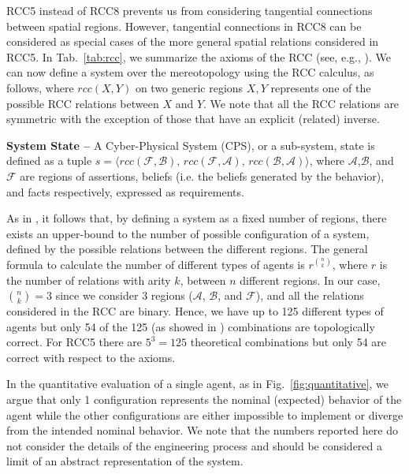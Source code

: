 \documentclass[runningheads]{llncs}
\newcommand{\assertionRegion}{\mathcal{A}}
\newcommand{\beliefRegion}{\mathcal{B}}
\newcommand{\factRegion}{\mathcal{F}}
\newcommand{\rcc}{rcc}
\begin{document}
RCC5 instead of RCC8 prevents us from considering tangential connections
between spatial regions. However, tangential connections in RCC8 can be
considered as special cases of the more general spatial relations considered in
RCC5.
In Tab.~\ref{tab:rcc}, we summarize the axioms of the RCC (see, e.g., \autocite{Grutter2008rcc}).  We can now define a system
over the mereotopology using the RCC calculus, as follows, where $\rcc(X,Y)$ on
two generic regions $X,Y$ represents one of the possible RCC relations between
$X$ and $Y$. We note that all the RCC relations are symmetric with the exception
of those that have an explicit (related) inverse.

\begin{definition}{\bf System State --}\label{def:opsystem}
  A Cyber-Physical System (CPS), or a sub-system, state is defined as a tuple
	$s=\langle\rcc(\factRegion,\beliefRegion),\,\rcc(\factRegion,\assertionRegion),\,\rcc(\beliefRegion,\assertionRegion)\rangle$,
	where $\assertionRegion$,$\beliefRegion$, and $\factRegion$ are regions of
	assertions, beliefs (i.e. the beliefs generated by the behavior), and
	facts respectively, expressed as requirements.
\end{definition}

As in \autocite{Santaca2016abf}, it follows that, by defining
a system as a fixed number of regions, there exists
an upper-bound to the number of possible configuration of a system, defined by
the possible relations between the different regions.
The general formula to calculate the number of different types of agents is
$r^{\binom{n}{k}}$, where $r$ is the number of relations with arity $k$,
between $n$ different regions. In our case, $\binom{n}{k}=3$ since we consider $3$ regions 
($\assertionRegion$, $\beliefRegion$, and $\factRegion$), and all the relations
considered in the RCC are binary.  Hence, we have up to 125
different types of agents but only 54 of the 125 (as showed in
\autocite{Grutter2008rcc}) combinations are topologically correct. 
For RCC5 there are $5^3=125$ theoretical combinations but
only 54 are correct with respect to the axioms.

In the quantitative evaluation of a single agent, as in Fig.~\ref{fig:quantitative},
we argue that only 1 configuration represents the nominal (expected) behavior 
of the agent while the other configurations are either impossible to 
implement or diverge from the intended nominal behavior. We note 
that the numbers reported here do not consider the details of the
engineering process and should be considered a limit of an abstract 
representation of the system.
\end{document}
